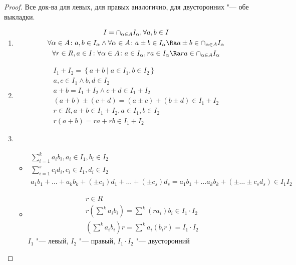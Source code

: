 \begin{proof}
	Все док-ва для левых, для правых аналогично, для двусторонних "--- обе выкладки.
	\begin{enumerate}
	\item 	\begin{gather*}
			 I = \cap_{\alpha \in A} I_\alpha, \forall a, b \in I \\
			 \forall \alpha \in A \colon a, b \in I_\alpha \land \forall \alpha \in A \colon a \pm b \in I_\alpha \Ra a \pm b \in \cap_{\alpha \in A}I_\alpha \\
			 \forall r \in R, a \in I \colon \forall \alpha \in A \colon a \in I_\alpha, ra \in I_\alpha \Ra ra \in \cap_{\alpha \in A} I_\alpha
		 \end{gather*}
	\item	\begin{gather*}
			 I_1 + I_2 = \left\{ a + b \mid a \in I_1, b \in I_2 \right\} \\
			a, c \in I_1 \land b, d \in I_2 \\
			a + b = I_1 + I_2 \land c + d \in I_1 + I_2 \\
			(a + b) \pm (c + d) = (a \pm c) + (b \pm d) \in I_1 + I_2 \\
			r \in R, a + b \in I_1 + I_2,  a \in I_1, b \in I_2 \\
			r(a + b) = ra + rb \in I_1 + I_2
		\end{gather*}
	\item \begin{itemize}
		\item \begin{gather*}
			\sum_{i = 1}^k a_i b_i, a_i \in I_1, b_i \in I_2 \\
			\sum_{i = 1}^s c_i d_i, c_i \in I_1, d_i \in I_2 \\
			a_1 b_1 + \dots + a_k b_k + (\pm c_1)d_1 + \dots + (\pm c_s)d_s = a_1 b_1 + \dots a_k b_k + (\pm \dots \pm c_s d_s) \in I_1 I_2
		\end{gather*}
		\item \begin{gather*}
			r \in R \\
			r\left(\sum^k a_i b_i\right) = \sum^k (ra_i)b_i \in I_1 \cdot I_2 \\
			\left(\sum^k a_i b_i\right)r = \sum^k a_i(b_ir) = I_1 \cdot I_2
		\end{gather*}
		$I_1$ "--- левый, $I_2$ "--- правый, $I_1 \cdot I_2$ "--- двусторонний
		\end{itemize}
	\end{enumerate}
\end{proof}

